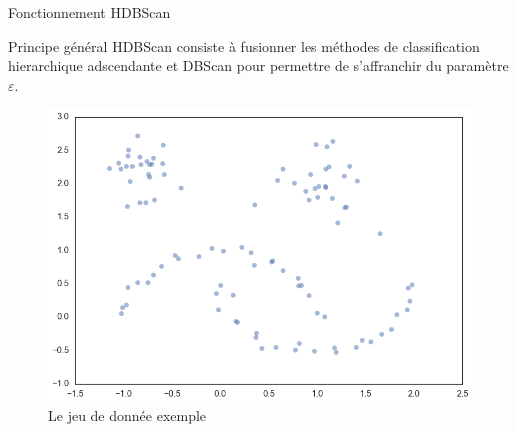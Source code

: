 \begin{frame}{Fonctionnement HDBScan\footnotemark }
    \begin{block}{Principe général}
        HDBScan consiste à fusionner les méthodes de classification hierarchique adscendante et DBScan pour permettre de s'affranchir du paramètre $\varepsilon$.
    \end{block}


    \begin{figure}
        \includegraphics[width=0.5\paperheight]{images/Illustration-HDBSCAN-1.png}
        \caption{\label{fig:ill_HDBScan_1}Le jeu de donnée exemple \footnotemark}
    \end{figure}

\end{frame}

